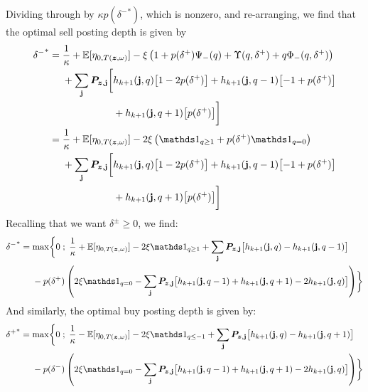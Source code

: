 Dividing through by $\kappa p({\delta^-}^*)$, which is nonzero, and re-arranging, we find that the optimal sell posting depth is given by
\begin{align}
\begin{split}
{\delta^-}^* & = \frac{1}{\kappa} + \E[\eta_{0,T(\bz, \omega)}] - \xi \left( 1 + p(\delta^+)\Psi_-(q) + \Upsilon(q,\delta^+) + q \Phi_-(q,\delta^+) \right) \\
& \hphantom{{}={}} +  \sum_\bj \bP_{\bz,\bj} \biggl[ h_{k+1}(\bj, q) \bigl[ 1 - 2 p(\delta^+) \bigr] + h_{k+1}(\bj, q-1) \bigl[-1 + p(\delta^+) \bigr] \\
& \hphantom{{}={} +  \sum_\bj \bP_{\bz,\bj} \biggl[} + h_{k+1}(\bj, q+1) \bigl[ p(\delta^+) \bigr] \biggr]
\end{split} \\
\begin{split}
& = \frac{1}{\kappa} + \E[\eta_{0,T(\bz, \omega)}] - 2 \xi \left( \indicator_{q \geq 1} + p(\delta^+)\indicator_{q = 0} \right) \\
& \hphantom{{}={}} +  \sum_\bj \bP_{\bz,\bj} \biggl[ h_{k+1}(\bj, q) \bigl[ 1 - 2 p(\delta^+) \bigr] + h_{k+1}(\bj, q-1) \bigl[-1 + p(\delta^+) \bigr] \\
& \hphantom{{}={} +  \sum_\bj \bP_{\bz,\bj} \biggl[} + h_{k+1}(\bj, q+1) \bigl[ p(\delta^+) \bigr] \biggr]
\end{split}
\end{align}
Recalling that we want $\delta^\pm \geq 0$, we find:
\begin{equation}\label{eq:discretedeltaminusreferential}
\begin{split}
{\delta^-}^* & = \max \biggl\lbrace 0 \; ; \; \frac{1}{\kappa} + \E[\eta_{0,T(\bz, \omega)}] - 2 \xi \indicator_{q \geq 1} + \sum_\bj \bP_{\bz,\bj} \bigl[ h_{k+1}(\bj, q) - h_{k+1}(\bj, q-1) \bigr] \\
& \hphantom{{}={}} -p(\delta^+) \left( 2 \xi \indicator_{q = 0} - \sum_\bj \bP_{\bz,\bj} \bigl[ h_{k+1}(\bj, q-1) + h_{k+1}(\bj, q+1) -2 h_{k+1}(\bj, q)  \bigr] \right) \biggr\rbrace
\end{split}
\end{equation}
And similarly, the optimal buy posting depth is given by:
\begin{equation}\label{eq:discretedeltaplusreferential}
\begin{split}
{\delta^+}^* & = \max \biggl\lbrace 0 \; ; \; \frac{1}{\kappa} - \E[\eta_{0,T(\bz, \omega)}] - 2 \xi \indicator_{q \leq -1} + \sum_\bj \bP_{\bz,\bj} \bigl[ h_{k+1}(\bj, q) - h_{k+1}(\bj, q+1) \bigr] \\
& \hphantom{{}={}} -p(\delta^-) \left( 2 \xi \indicator_{q = 0} - \sum_\bj \bP_{\bz,\bj} \bigl[ h_{k+1}(\bj, q-1) + h_{k+1}(\bj, q+1) -2 h_{k+1}(\bj, q)  \bigr] \right) \biggr\rbrace
\end{split}
\end{equation}
